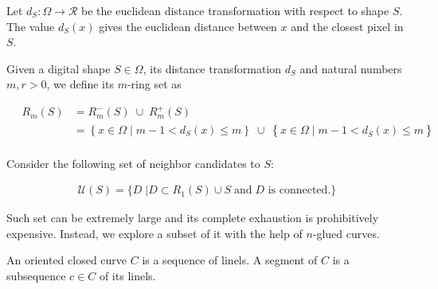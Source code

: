 \documentclass[runningheads]{llncs}
\begin{document}
Let $d_{S}:\Omega \rightarrow \mathcal{R}$ be the euclidean distance transformation with respect to shape $S$. The value $d_S(x)$ gives the euclidean distance between $x$ and the closest pixel in $S$. 

\begin{definition}
Given a digital shape $S\in\Omega$, its distance transformation $d_S$ and natural numbers $m,r > 0$, we define its $m$-ring set as

\begin{align*}
	\quad R_m(S) &= R_m^-(S) \; \cup \; R_m^+(S) \\
	&= \left\{ x \in \Omega \; | \; m-1 < d_S(x) \leq m \right\} \; \cup \;  \left\{ x \in \Omega \; | \; 	m-1 < d_{\overline{S}}(x) \leq m \right\}\\
\end{align*}

\end{definition}

Consider the following set of neighbor candidates to $S$:

\begin{align*}
\mathcal{U}(S) = \{ D \; | D \subset R_1(S) \cup S \; \text{and} \; \text{$D$ is connected}. \}
\end{align*}


Such set can be extremely large and its complete exhaustion is prohibitively expensive.  Instead, we explore a subset of it with the help of $n$-glued curves.

An oriented closed curve $C$ is a sequence of linels. A segment of $C$ is a subsequence $c \in C$ of its linels.
\end{document}
